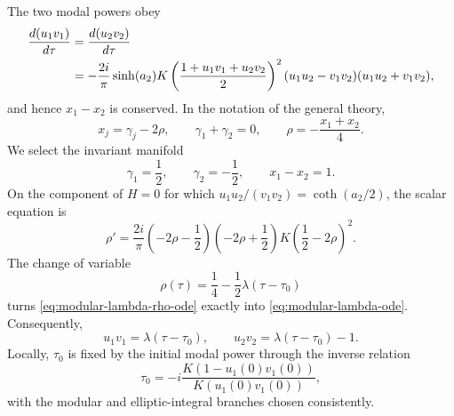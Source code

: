 \documentclass[11pt,a4paper]{article}
\numberwithin{equation}{section}
\begin{document}
The two modal powers obey
\begin{align}
    \frac{d(u_1v_1)}{d\tau}
    &=\frac{d(u_2v_2)}{d\tau}
    \notag\\
    &=-\frac{2i}{\pi}\sinh(a_2)
    K\left(\frac{1+u_1v_1+u_2v_2}{2}\right)^2
    (u_1u_2-v_1v_2)(u_1u_2+v_1v_2),
    \label{eq:modular-lambda-power-evolution}
\end{align}
and hence $x_1-x_2$ is conserved.
In the notation of the general theory,
\begin{equation}
    x_j=\gamma_j-2\rho,
    \qquad
    \gamma_1+\gamma_2=0,
    \qquad
    \rho=-\frac{x_1+x_2}{4}.
\end{equation}
We select the invariant manifold
\begin{equation}
    \gamma_1=\frac{1}{2},
    \qquad
    \gamma_2=-\frac{1}{2},
    \qquad
    x_1-x_2=1.
    \label{eq:modular-lambda-gamma-values}
\end{equation}
On the component of $H=0$ for which
$u_1u_2/(v_1v_2)=\coth(a_2/2)$, the scalar equation is
\begin{equation}
    \rho'
    =\frac{2i}{\pi}
    \left(-2\rho-\frac{1}{2}\right)
    \left(-2\rho+\frac{1}{2}\right)
    K\left(\frac{1}{2}-2\rho\right)^2.
    \label{eq:modular-lambda-rho-ode}
\end{equation}
The change of variable
\begin{equation}
    \rho(\tau)=\frac{1}{4}-\frac{1}{2}\lambda(\tau-\tau_0)
    \label{eq:modular-lambda-rho-solution}
\end{equation}
turns \eqref{eq:modular-lambda-rho-ode} exactly into \eqref{eq:modular-lambda-ode}.
Consequently,
\begin{equation}
    u_1v_1=\lambda(\tau-\tau_0),
    \qquad
    u_2v_2=\lambda(\tau-\tau_0)-1.
    \label{eq:modular-lambda-modal-powers}
\end{equation}
Locally, $\tau_0$ is fixed by the initial modal power through the inverse relation
\begin{equation}
    \tau_0
    =-i\frac{K(1-u_1(0)v_1(0))}{K(u_1(0)v_1(0))},
    \label{eq:modular-lambda-tau0}
\end{equation}
with the modular and elliptic-integral branches chosen consistently.
\end{document}
